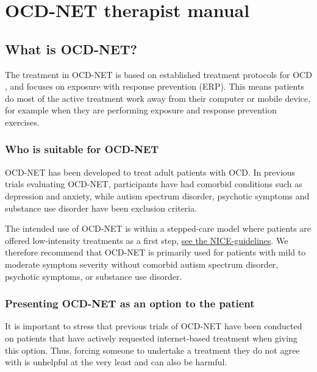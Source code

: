 \documentclass[]{book}
\theoremstyle{definition}
\theoremstyle{definition}
\theoremstyle{definition}
\theoremstyle{remark}
\begin{document}
\hypertarget{ocd-net-therapist-manual}{%
\chapter{OCD-NET therapist manual}\label{ocd-net-therapist-manual}}

\hypertarget{what-is-ocd-net}{%
\section{What is OCD-NET?}\label{what-is-ocd-net}}

The treatment in OCD-NET is based on established treatment protocols for
OCD \citep{foa2012}, and focuses on exposure with response prevention
(ERP). This means patients do most of the active treatment work away
from their computer or mobile device, for example when they are
performing exposure and response prevention exercises.

\hypertarget{who-is-suitable-for-ocd-net}{%
\subsection{Who is suitable for
OCD-NET}\label{who-is-suitable-for-ocd-net}}

OCD-NET has been developed to treat adult patients with OCD. In previous
trials evaluating OCD-NET, participants have had comorbid conditions
such as depression and anxiety, while autism spectrum disorder,
psychotic symptoms and substance use disorder have been exclusion
criteria.

The intended use of OCD-NET is within a stepped-care model where
patients are offered low-intensity treatments as a first step,
\href{https://www.nice.org.uk/guidance/CG31/chapter/1-Guidance\#stepped-care-for-adults-young-people-and-children-with-ocd-or-bdd}{see
the NICE-guidelines}. We therefore recommend that OCD-NET is primarily
used for patients with mild to moderate symptom severity without
comorbid autism spectrum disorder, psychotic symptoms, or substance use
disorder.

\hypertarget{presenting-ocd-net-as-an-option-to-the-patient}{%
\subsection{Presenting OCD-NET as an option to the
patient}\label{presenting-ocd-net-as-an-option-to-the-patient}}

It is important to stress that previous trials of OCD-NET have been
conducted on patients that have actively requested internet-based
treatment when giving this option. Thus, forcing someone to undertake a
treatment they do not agree with is unhelpful at the very least and can
also be harmful.
\end{document}
